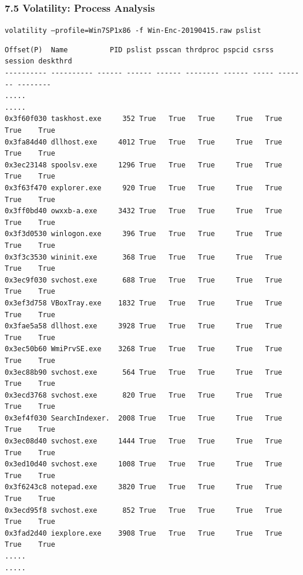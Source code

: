 \begin{frame}[fragile]
  \frametitle{7.5 Volatility: Process Analysis}
    \texttt{\footnotesize volatility --profile=Win7SP1x86 -f Win-Enc-20190415.raw pslist}
    \begin{lstlisting}[basicstyle=\tiny]
Offset(P)  Name          PID pslist psscan thrdproc pspcid csrss session deskthrd
---------- ---------- ------ ------ ------ -------- ------ ----- ------- --------
.....
.....
0x3f60f030 taskhost.exe     352 True   True   True     True   True  True    True
0x3fa84d40 dllhost.exe     4012 True   True   True     True   True  True    True
0x3ec23148 spoolsv.exe     1296 True   True   True     True   True  True    True
0x3f63f470 explorer.exe     920 True   True   True     True   True  True    True
0x3ff0bd40 owxxb-a.exe     3432 True   True   True     True   True  True    True
0x3f3d0530 winlogon.exe     396 True   True   True     True   True  True    True
0x3f3c3530 wininit.exe      368 True   True   True     True   True  True    True
0x3ec9f030 svchost.exe      688 True   True   True     True   True  True    True
0x3ef3d758 VBoxTray.exe    1832 True   True   True     True   True  True    True
0x3fae5a58 dllhost.exe     3928 True   True   True     True   True  True    True
0x3ec50b60 WmiPrvSE.exe    3268 True   True   True     True   True  True    True
0x3ec88b90 svchost.exe      564 True   True   True     True   True  True    True
0x3ecd3768 svchost.exe      820 True   True   True     True   True  True    True
0x3ef4f030 SearchIndexer.  2008 True   True   True     True   True  True    True
0x3ec08d40 svchost.exe     1444 True   True   True     True   True  True    True
0x3ed10d40 svchost.exe     1008 True   True   True     True   True  True    True
0x3f6243c8 notepad.exe     3820 True   True   True     True   True  True    True
0x3ecd95f8 svchost.exe      852 True   True   True     True   True  True    True
0x3fad2d40 iexplore.exe    3908 True   True   True     True   True  True    True
.....
.....
    \end{lstlisting}
\end{frame}


